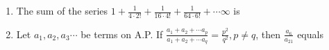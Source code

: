 \documentclass[journal]{IEEEtran}
\begin{document}
\begin{enumerate}[label={\arabic*.}]
\item {The sum of the series $1+\frac{1}{4\cdot2!}+\frac{1}{16\cdot4!}+\frac{1}{64\cdot6!}+\cdots  \infty$ is}
{\hfill{}} 
\begin{enumerate}
\end{enumerate}

\item {Let $a_1, a_2, a_3 \cdots$ be terms on A.P. If $\frac{a_1+a_2+\cdots a_p}{a_1+a_2+\cdots a_q}= \frac{p^2}{q^2},p \neq q$, then $\frac{a_6}{a_{21}}$ equals}
{\hfill{} }
\begin{enumerate}
\end{enumerate}

\end{enumerate}
\end{document}
